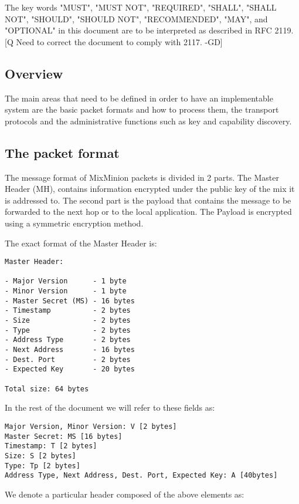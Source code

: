 \documentclass{article}
\begin{document}
The key words "MUST", "MUST NOT", "REQUIRED", "SHALL", "SHALL
NOT", "SHOULD", "SHOULD NOT", "RECOMMENDED",  "MAY", and
"OPTIONAL" in this document are to be interpreted as described in
RFC 2119. [Q Need to correct the document to comply with 2117. -GD]

\subsection{Overview}

The main areas that need to be defined in order to have an
implementable system are the basic packet formats and how to process
them, the transport protocols and the administrative functions such as
key and capability discovery. 

\subsection{The packet format}

The message format of MixMinion packets is divided in
2 parts. The Master Header (MH), contains information encrypted under 
the public key of the mix it is addressed to. The second part is the 
payload that contains the message to be forwarded to the next hop or 
to the local application. The Payload is encrypted using a symmetric 
encryption method.

The exact format of the Master Header is:

\begin{verbatim}
Master Header:

- Major Version      - 1 byte
- Minor Version      - 1 byte
- Master Secret (MS) - 16 bytes
- Timestamp          - 2 bytes
- Size               - 2 bytes
- Type               - 2 bytes
- Address Type       - 2 bytes
- Next Address       - 16 bytes
- Dest. Port         - 2 bytes
- Expected Key       - 20 bytes

Total size: 64 bytes
\end{verbatim}

In the rest of the document we will refer to these fields as:

\begin{verbatim}
Major Version, Minor Version: V [2 bytes]
Master Secret: MS [16 bytes]
Timestamp: T [2 bytes]
Size: S [2 bytes]
Type: Tp [2 bytes]
Address Type, Next Address, Dest. Port, Expected Key: A [40bytes]
\end{verbatim}

We denote a particular header composed of the above elements as:
\end{document}
